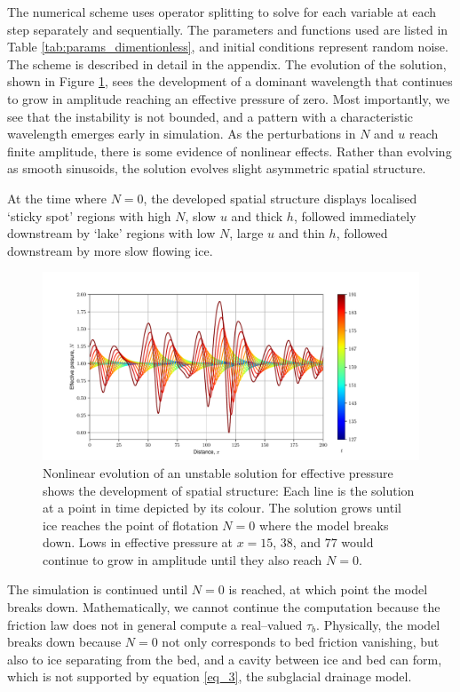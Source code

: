 \documentclass[journal abbreviation, manuscript]{copernicus}
\begin{document}
The numerical scheme uses operator splitting to solve for each variable at each step separately and sequentially. The parameters and functions used are listed in Table \ref{tab:params_dimentionless}, and initial conditions represent random noise. The scheme is described in detail in the appendix.
The evolution of the solution, shown in Figure \ref{fig:instability_float_1}, sees the development of a  dominant wavelength that continues to grow in amplitude reaching an effective pressure of zero. Most importantly, we see that the instability is not bounded, and a pattern with a characteristic wavelength emerges
early in simulation.
As the perturbations in $N$ and $u$ reach finite amplitude, there is some evidence of nonlinear effects. Rather than evolving as smooth sinusoids, the solution evolves slight asymmetric spatial structure. 

At the time where $N=0$, the developed spatial structure displays localised `sticky spot' regions with high $N$, slow $u$ and thick $h$, followed immediately downstream by `lake' regions with low $N$, large $u$ and thin $h$, followed downstream by more slow flowing ice.

\begin{figure}[htb!]
\centering
\includegraphics[width=1\textwidth]{pictures/growtofloat.pdf}
\caption[Nonlinear evolution of an unstable solution]{Nonlinear evolution of an unstable solution for effective pressure shows the development of spatial structure: Each line is the solution at a point in time depicted by its colour.  The solution grows until ice reaches the point of flotation $N=0$ where the model breaks down. Lows in effective pressure at $x=15$, $38$, and $77$ would continue to grow in amplitude until they also reach $N=0$.}
\label{fig:instability_float_1}
\end{figure}

The simulation is continued until $N = 0$ is reached, at which point the model breaks down. Mathematically, we cannot continue the computation because the friction law does not in general compute a 
real--valued $\tau_b$. Physically, the model breaks down because $N = 0$ not 
only corresponds to bed friction vanishing, but also to ice separating 
from the bed, and a cavity 
between ice and bed can form, which is not supported by equation \eqref{eq_3}, the subglacial drainage model.
\end{document}
